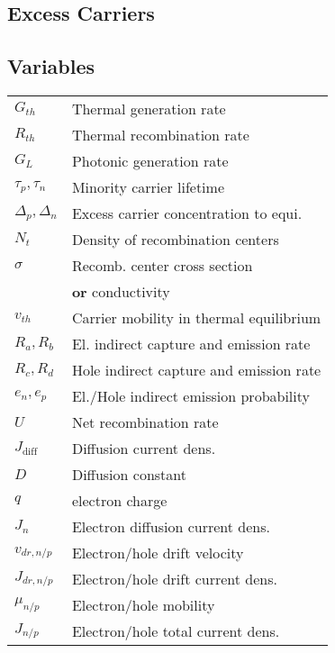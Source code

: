 \documentclass[a4paper, fontsize=8pt, landscape, DIV=1]{scrartcl}
\begin{document}
\begin{multicols*}{4}
  \section{Excess Carriers}
  \subsection{Variables}

    \begin{tabular}[h]{l l}
      $G_{th}$   & Thermal generation rate \\
      $R_{th}$   & Thermal recombination rate \\
      $G_{L}$    & Photonic generation rate \\
      $\tau_p, \tau_n$   & Minority carrier lifetime \\
      $\Delta_p, \Delta_n$   & Excess carrier concentration to equi. \\
      $N_t$    & Density of recombination centers \\
      $\sigma$    & Recomb. center cross section \\
      {}    & \textbf{or} conductivity \\
      $v_{th}$    & Carrier mobility in thermal equilibrium \\
      $R_a,R_b$    & El. indirect capture and emission rate \\
      $R_c,R_d$    & Hole indirect capture and emission rate \\
      $e_n,e_p$    & El./Hole indirect emission probability \\
      $U$    & Net recombination rate \\
      $J_{\text{diff}}$ & Diffusion current dens. \\
      $D$ & Diffusion constant \\
      $q$ & electron charge \\
      $J_n$ & Electron diffusion current dens.\\
      $v_{dr,n/p}$ & Electron/hole drift velocity \\
      $J_{dr,n/p}$ & Electron/hole drift current dens.\\
      $\mu_{n/p}$ & Electron/hole mobility \\
      $J_{n/p}$ & Electron/hole total current dens. \\
    \end{tabular}


\end{multicols*}
\end{document}
